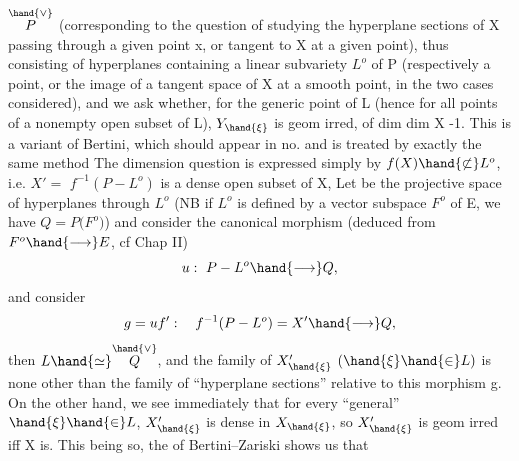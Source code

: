 
$\overset{\hand{\vee}}{P}$ (corresponding to the question of studying the hyperplane sections of X
passing through a given point x, or tangent to X at a given  point),
thus consisting of hyperplanes containing a linear subvariety $L^{o}$ of P
(respectively a point, or the image of a tangent space of X at a smooth point,
in the two cases considered), and we ask whether,
for the generic point \hand{$\xi$} of L (hence for all points of a nonempty
open subset of L), $Y_{\hand{\xi}}$ is  geom irred, of
dim dim X -1. This is a variant of Bertini, which should appear
in no.  and is treated by exactly the same method The dimension
question is expressed simply by $f(X)\hand{\not\subset} L^{o}$, 
i.e. $X' =$  $f^{-1}(P - L^{o})$ is a dense open subset of X, 
Let  be the projective space of hyperplanes through $L^{o}$ (NB if $L^{o}$ is
defined by a vector subspace $F^{o}$ of E, we have $Q = P($$F^{o})$) and
consider the canonical morphism (deduced from  $F^{o}\hand{\longrightarrow} E$, cf
Chap II)
\[ u :\ P - L^{o} \hand{\longrightarrow} Q, \]
and consider
\[ g = u f' :\quad f^{-1}(P - L^{o}) = X' \hand{\longrightarrow} Q , \]
then  $L \hand{\simeq} \overset{\hand{\vee}}{Q}$, and the family of
$X'_{\hand{\xi}}$ $(\hand{\xi}\hand{\in} L)$ is none other than the family of “hyperplane sections” relative
to this morphism g. On the other hand, we see immediately that for every
“general” $\hand{\xi}\hand{\in} L$, $X'_{\hand{\xi}}$ is dense in $X_{\hand{\xi}}$, so $X'_{\hand{\xi}}$ is geom irred iff
X is. This being so, the  of Bertini–Zariski shows us that
